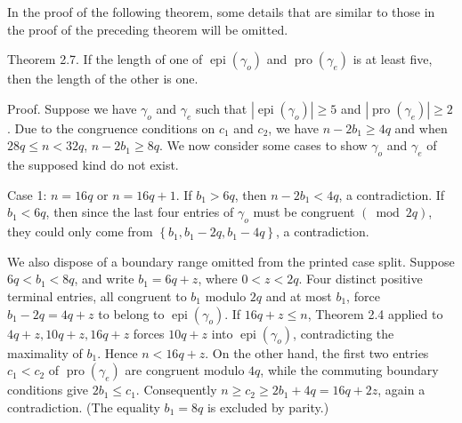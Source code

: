 \documentclass[10pt]{article}
\begin{document}
In the proof of the following theorem, some details that are similar to those in the proof of the preceding theorem will be omitted.

Theorem 2.7. If the length of one of $\operatorname{epi}\left(\gamma_{o}\right)$ and $\operatorname{pro}\left(\gamma_{e}\right)$ is at least five, then the length of the other is one.

Proof. Suppose we have $\gamma_{o}$ and $\gamma_{e}$ such that $\left|\operatorname{epi}\left(\gamma_{o}\right)\right| \geq 5$ and $\left|\operatorname{pro}\left(\gamma_{e}\right)\right| \geq 2$. Due to the congruence conditions on $c_{1}$ and $c_{2}$, we have $n-2 b_{1} \geq 4 q$ and when $28 q \leq n<32 q$, $n-2 b_{1} \geq 8 q$. We now consider some cases to show $\gamma_{o}$ and $\gamma_{e}$ of the supposed kind do not exist.

Case 1: $n=16 q$ or $n=16 q+1$. If $b_{1}>6 q$, then $n-2 b_{1}<4 q$, a contradiction. If $b_{1}<6 q$, then since the last four entries of $\gamma_{o}$ must be congruent $(\bmod 2 q)$, they could only come from $\left\{b_{1}, b_{1}-2 q, b_{1}-4 q\right\}$, a contradiction.

We also dispose of a boundary range omitted from the printed case split. Suppose $6q<b_{1}<8q$, and write $b_{1}=6q+z$, where $0<z<2q$. Four distinct positive terminal entries, all congruent to $b_{1}$ modulo $2q$ and at most $b_{1}$, force $b_{1}-2q=4q+z$ to belong to $\operatorname{epi}(\gamma_o)$. If $16q+z\leq n$, Theorem 2.4 applied to $4q+z,10q+z,16q+z$ forces $10q+z$ into $\operatorname{epi}(\gamma_o)$, contradicting the maximality of $b_{1}$. Hence $n<16q+z$. On the other hand, the first two entries $c_{1}<c_{2}$ of $\operatorname{pro}(\gamma_e)$ are congruent modulo $4q$, while the commuting boundary conditions give $2b_{1}\leq c_{1}$. Consequently $n\geq c_{2}\geq2b_{1}+4q=16q+2z$, again a contradiction. (The equality $b_{1}=8q$ is excluded by parity.)
\end{document}

